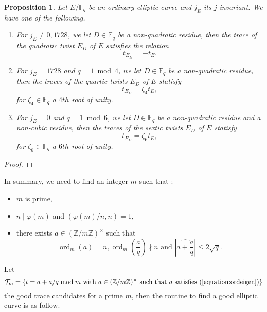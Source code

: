 \documentclass[12pt]{article}
\theoremstyle{plain}
\newtheorem{proposition}[theorem]{Proposition}
\theoremstyle{definition}
\DeclareMathOperator{\order}{ord} %
\def\Z{\ensuremath{\mathbb{Z}}}
\def\F{\ensuremath{\mathbb{F}}}
\begin{document}
\begin{proposition}
\label{proposition:twisttrace}
Let $E/\F_q$ be an ordinary elliptic curve and $j_E$ its $j$-invariant. We have
one of the following.

\begin{enumerate}
    \item For $j_E\neq0,1728$, we let $D\in\F_q$ be a non-quadratic residue, then
the trace of the quadratic twist $E_D$ of $E$ satisfies the relation
\begin{equation}
t_{E_D} = -t_E.
\end{equation}

    \item For $j_E=1728$ and $q=1\bmod4$, we let $D\in\F_q$ be a non-quadratic residue, then the
traces of the quartic twists $E_D$ of $E$ statisfy
\begin{equation}
t_{E_D} = \zeta_4t_E,
\end{equation}
for $\zeta_4\in\F_q$ a $4th$ root of unity.

    \item For $j_E=0$ and $q=1\bmod6$, we let $D\in\F_q$ be a non-quadratic
residue and a non-cubic residue, then the
traces of the sextic twists $E_D$ of $E$ statisfy
\begin{equation}
t_{E_D} = \zeta_6t_E,
\end{equation}
for $\zeta_6\in\F_q$ a $6th$ root of unity.
\end{enumerate}

\end{proposition}

\begin{proof}
\end{proof}

In summary, we need to find an integer $m$ such that :
\begin{itemize}
    \item $m$ is prime,
    \item $n\mid\varphi(m)$ and $(\varphi(m)/n,n)=1$,
    \item there exists $a\in(\Z/m\Z)^{\times}$ such that 
\begin{equation}
\label{equation:ordeigen}
\order_m(a) = n,\order_m(\dfrac{a}{q}) \nmid n\text{ and }|\widehat{a + \dfrac{a}{q}}| \leq 2\sqrt{q}.
\end{equation}
\end{itemize}
Let
\begin{equation}
\mathcal{T}_m = \lbrace{t = a + a/q \bmod m \text{ with } a\in(\Z/m\Z)^{\times}
\text{ such that } a \text{ satisfies 
}(\ref{equation:ordeigen})}\rbrace
\end{equation}
the good trace candidates for a prime $m$, then the
routine to find a good elliptic curve is as follow.
\end{document}
